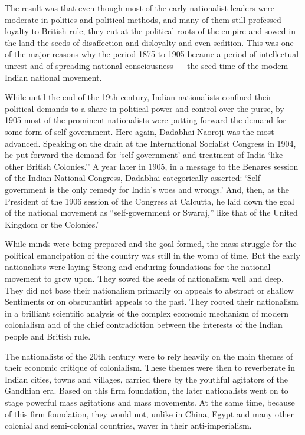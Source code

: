 The result was that even though most of the early nationalist leaders were moderate in politics and political methods, and many of them still professed loyalty to British rule, they cut at the political roots of the empire and sowed in the land the seeds of disaffection and disloyalty and even sedition. This was one of the major reasons why the period 1875 to 1905 became a period of intellectual unrest and of spreading national consciousness — the seed-time of the modem Indian national movement.

While until the end of the 19th century, Indian nationalists confined their political demands to a share in political power and control over the purse, by 1905 most of the prominent nationalists were putting forward the demand for some form of self-government. Here again, Dadabhai Naoroji was the most advanced. Speaking on the drain at the International Socialist Congress in 1904, he put forward the demand for `self-government' and treatment of India `like other British Colonies.'' A year later in 1905, in a message to the Benares session of the Indian National Congress, Dadabhai categorically asserted: `Self-government is the only remedy for India's woes and wrongs.' And, then, as the President of the 1906 session of the Congress at Calcutta, he laid down the goal of the national movement as ``self-government or Swaraj,'' like that of the United Kingdom or the Colonies.'

While minds were being prepared and the goal formed, the mass struggle for the political emancipation of the country was still in the womb of time. But the early nationalists were laying Strong and enduring foundations for the national movement to grow upon. They sowed the seeds of nationalism well and deep. They did not base their nationalism primarily on appeals to abstract or shallow Sentiments or on obscurantist appeals to the past. They rooted their nationalism in a brilliant scientific analysis of the complex economic mechanism of modern colonialism and of the chief contradiction between the interests of the Indian people and British rule.

The nationalists of the 20th century were to rely heavily on the main themes of their economic critique of colonialism. These themes were then to reverberate in Indian cities, towns and villages, carried there by the youthful agitators of the Gandhian era. Based on this firm foundation, the later nationalists went on to stage powerful mass agitations and mass movements. At the same time, because of this firm foundation, they would not, unlike in China, Egypt and many other colonial and semi-colonial countries, waver in their anti-imperialism.
